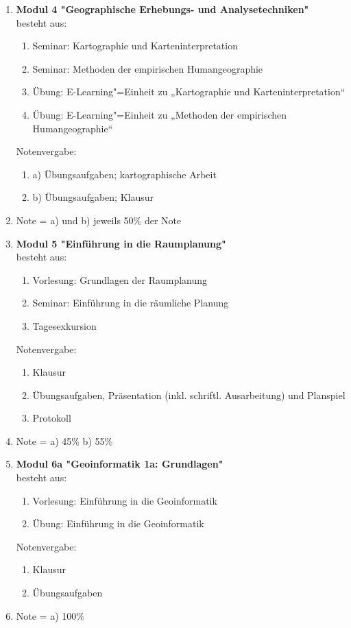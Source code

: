 \begin{enumerate}
 \item \textbf{Modul 4 "Geographische Erhebungs- und Analysetechniken"}  \\ besteht aus:
  \begin{enumerate}
   \item Seminar: Kartographie und Karteninterpretation
   \item Seminar: Methoden der empirischen Humangeographie
   \item Übung: E-Learning"=Einheit zu „Kartographie und Karteninterpretation“
   \item Übung: E-Learning"=Einheit zu „Methoden der empirischen Humangeographie“
  \end{enumerate}
  Notenvergabe:
   \begin{enumerate}
    \item[] a) Übungsaufgaben; kartographische Arbeit
    \item[] b) Übungsaufgaben; Klausur
  \end{enumerate}
  \item[] Note = a) und b) jeweils 50\% der Note

 \item \textbf{Modul 5 "Einführung in die Raumplanung"}  \\ besteht aus:
  \begin{enumerate}
   \item Vorlesung: Grundlagen der Raumplanung
   \item Seminar: Einführung in die räumliche Planung
   \item Tagesexkursion
  \end{enumerate}
  Notenvergabe:
  \begin{enumerate}
   \item Klausur
   \item Übungsaufgaben, Präsentation (inkl. schriftl. Ausarbeitung) und Planspiel
   \item Protokoll
  \end{enumerate}
  \item[] Note = a) 45\% b) 55\%

 \item \textbf{Modul 6a "Geoinformatik 1a: Grundlagen"}  \\ besteht aus:
  \begin{enumerate}
   \item Vorlesung: Einführung in die Geoinformatik
   \item Übung: Einführung in die Geoinformatik
  \end{enumerate}
  Notenvergabe:
  \begin{enumerate}
   \item Klausur
   \item Übungsaufgaben
  \end{enumerate}
  \item[] Note = a) 100\%


\end{enumerate}
